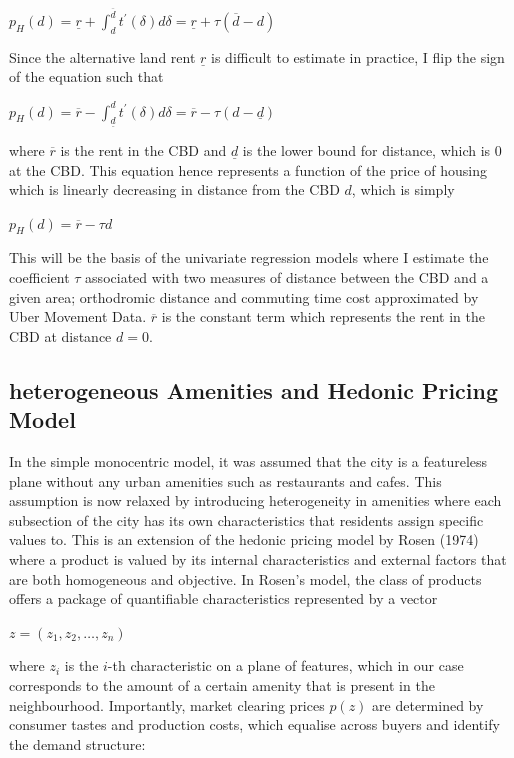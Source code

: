 \documentclass{article}
\begin{document}
\begin{center}
$p _ { H } ( d ) = \underline { r } + \int _ { d } ^ { \overline { d } } t ^ { \prime } ( \delta ) d \delta = \underline { r } + \tau ( \overline { d } - d )$
\end{center}
Since the alternative land rent $\underline{r}$ is difficult to estimate in practice, I flip the sign of the equation such that 
\begin{center}
$p _ { H } ( d ) = \overline { r } - \int _ { \underline { d } } ^ { d } t ^ { \prime } ( \delta ) d \delta = \overline { r } - \tau ( d - \underline { d } )$
\end{center}
where $\overline{r}$ is the rent in the CBD and $\underline{d}$ is the lower bound for distance, which is 0 at the CBD. This equation hence represents a function of the price of housing which is linearly decreasing in distance from the CBD $d$, which is simply
\begin{center}
$p _ { H } ( d ) = \overline { r } - \tau d$
\end{center}
This will be the basis of the univariate regression models where I estimate the coefficient $\tau$ associated with two measures of distance between the CBD and a given area; orthodromic distance and commuting time cost approximated by Uber Movement Data. $\overline{r}$ is the constant term which represents the rent in the CBD at distance $d = 0$.

\subsection{heterogeneous Amenities and Hedonic Pricing Model}
In the simple monocentric model, it was assumed that the city is a featureless plane without any urban amenities such as restaurants and cafes. This assumption is now relaxed by introducing heterogeneity in amenities where each subsection of the city has its own characteristics that residents assign specific values to. This is an extension of the hedonic pricing model by Rosen (1974) where a product is valued by its internal characteristics and external factors that are both homogeneous and objective. In Rosen's model, the class of products offers a package of quantifiable characteristics represented by a vector 

\begin{center}
    $z = \left( z _ { 1 } , z _ { 2 } , \dots , z _ { n } \right)$
\end{center}

where $z_i$ is the $i$-th characteristic on a plane of features, which in our case corresponds to the amount of a certain amenity that is present in the neighbourhood. Importantly, market clearing prices $p(z)$ are determined by consumer tastes and production costs, which equalise across buyers and identify the demand structure:
\end{document}
